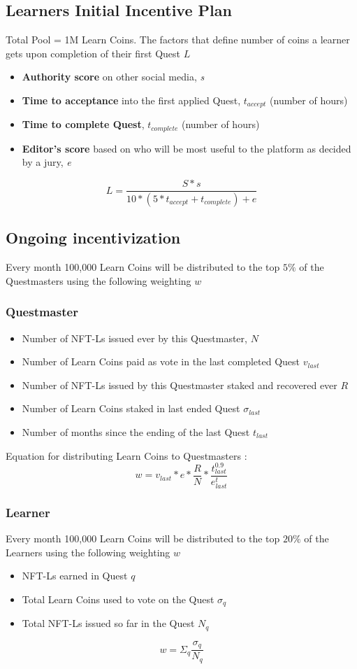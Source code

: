 \documentclass{article}
\begin{document}
    \subsection{Learners Initial Incentive Plan}
      Total Pool = 1M Learn Coins. The factors that define number of coins a learner gets upon completion of their first Quest \(L\)
      \begin{itemize}
        \item \textbf{Authority score} on other social media, \textit{s}
        \item \textbf{Time to acceptance} into the first applied Quest, \(t_{accept}\) (number of hours)
        \item \textbf{Time to complete Quest}, \(t_{complete}\) (number of hours)
        \item \textbf{Editor's score} based on who will be most useful to the platform as decided by a jury, \textit{e}
      \end{itemize}
      \[
        L = \frac{S * s}{10 * (5*t_{accept} + t_{complete}) + e}
      \]
    \subsection{Ongoing incentivization}
      Every month 100,000 Learn Coins will be distributed to the top \(5\%\) of the Questmasters using the following weighting \(w\) 
      \subsubsection{Questmaster}
        \begin{itemize}
          \item Number of NFT-Ls issued ever by this Questmaster, \(N\)
          \item Number of Learn Coins paid as vote in the last completed Quest \(v_{last}\)
          \item Number of NFT-Ls issued by this Questmaster staked and recovered ever \(R\)
          \item Number of Learn Coins staked in last ended Quest \(\sigma_{last}\)
          \item Number of months since the ending of the last Quest \(t_{last}\)
        \end{itemize}
        Equation for distributing Learn Coins to Questmasters :
        \[
          w =  v_{last} * e * \frac{R}{N} * \frac{t_{last}^{0.9}}{e^t_{last}}
        \]

      \subsubsection{Learner }  
        Every month 100,000 Learn Coins will be distributed to the top \(20\%\) of the Learners using the following weighting \(w\) 
        \begin{itemize}
          \item NFT-Ls earned in Quest \(q\)
          \item Total Learn Coins used to vote on the Quest \(\sigma_q\)
          \item Total NFT-Ls issued so far in the Quest \(N_q\)
        \end{itemize}
        \[
          w = \Sigma_{q} \frac{\sigma_q}{N_q}
        \]
\end{document}
